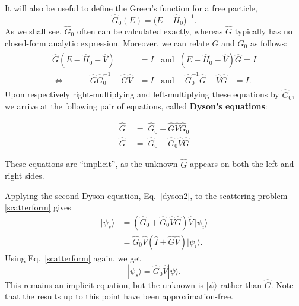 \documentclass[pra,12pt]{revtex4-2}
\begin{document}
It will also be useful to define the Green's function for a free
particle,
\begin{equation}
  \hat{G}_0(E)=\big(E-\hat{H}_0\big)^{-1}.
  \label{G0unregulated}
\end{equation}
As we shall see, $\hat{G}_0$ often can be calculated exactly, whereas
$\hat{G}$ typically has no closed-form analytic expression.  Moreover,
we can relate $G$ and $G_0$ as follows:
\begin{align}
  \begin{aligned}
    \hat{G}(E-\hat{H}_0 - \hat{V})\;\; &= I \;\;\;\mathrm{and}\;\; (E-\hat{H}_0 - \hat{V})\hat{G} = I \\ \Leftrightarrow \quad\qquad \hat{G} \hat{G}_0^{-1} - \hat{G}\hat{V} &= I \;\;\; \mathrm{and}\;\;\;\;\, \hat{G}_0^{-1} \hat{G} - \hat{V}\hat{G} \;\;\;= I.
  \end{aligned}
\end{align}
Upon respectively right-multiplying and left-multiplying these equations
by $\hat{G}_0$, we arrive at the following pair of equations, called
\textbf{Dyson's equations}:
\begin{framed}
  \begin{align}
    \hat{G} \;&= \; \hat{G}_0 + \hat{G}\hat{V}\hat{G}_0 \\
    \hat{G} \;&=\; \hat{G}_0 + \hat{G}_0\hat{V}\hat{G} \label{dyson2}
  \end{align}
\end{framed}
\vskip-0.1in
\noindent
These equations are ``implicit'', as the unknown $\hat{G}$ appears on
both the left and right sides.

Applying the second Dyson equation, Eq.~\eqref{dyson2}, to the
scattering problem \eqref{scatterform} gives
\begin{align}
  |\psi_s\rangle
  &= \left(\hat{G}_0 + \hat{G}_0\hat{V}\hat{G}\right) \hat{V}
  \, |\psi_i\rangle \\
  &= \hat{G}_0 \hat{V} \left(\hat{I} + \hat{G} \hat{V}\right) |\psi_i\rangle.
  \label{psis_useful}
\end{align}
Using Eq.~\eqref{scatterform} again, we get
\begin{equation}
  |\psi_s\rangle = \hat{G}_0\hat{V} |\psi\rangle.
  \label{psis_implicity}
\end{equation}
This remains an implicit equation, but the unknown is $|\psi\rangle$
rather than $\hat{G}$.  Note that the results up to this point have
been approximation-free.
\end{document}
